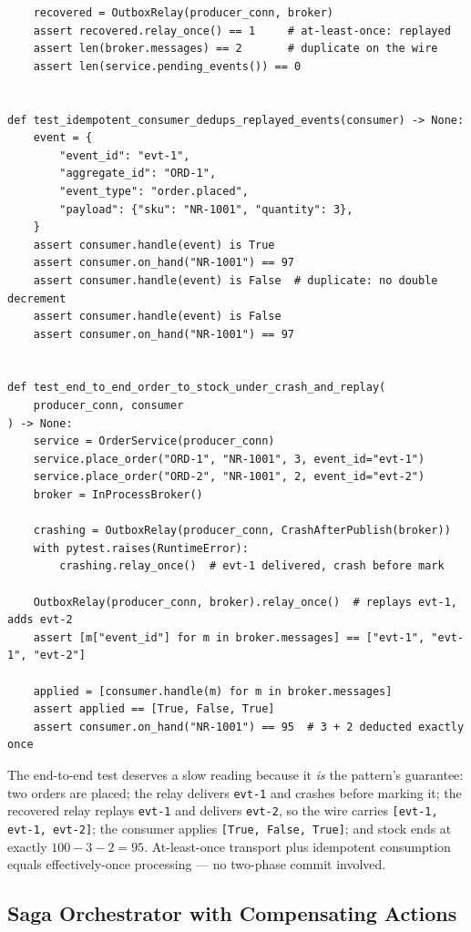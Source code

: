 \begin{verbatim}
    recovered = OutboxRelay(producer_conn, broker)
    assert recovered.relay_once() == 1     # at-least-once: replayed
    assert len(broker.messages) == 2       # duplicate on the wire
    assert len(service.pending_events()) == 0


def test_idempotent_consumer_dedups_replayed_events(consumer) -> None:
    event = {
        "event_id": "evt-1",
        "aggregate_id": "ORD-1",
        "event_type": "order.placed",
        "payload": {"sku": "NR-1001", "quantity": 3},
    }
    assert consumer.handle(event) is True
    assert consumer.on_hand("NR-1001") == 97
    assert consumer.handle(event) is False  # duplicate: no double decrement
    assert consumer.handle(event) is False
    assert consumer.on_hand("NR-1001") == 97


def test_end_to_end_order_to_stock_under_crash_and_replay(
    producer_conn, consumer
) -> None:
    service = OrderService(producer_conn)
    service.place_order("ORD-1", "NR-1001", 3, event_id="evt-1")
    service.place_order("ORD-2", "NR-1001", 2, event_id="evt-2")
    broker = InProcessBroker()

    crashing = OutboxRelay(producer_conn, CrashAfterPublish(broker))
    with pytest.raises(RuntimeError):
        crashing.relay_once()  # evt-1 delivered, crash before mark

    OutboxRelay(producer_conn, broker).relay_once()  # replays evt-1, adds evt-2
    assert [m["event_id"] for m in broker.messages] == ["evt-1", "evt-1", "evt-2"]

    applied = [consumer.handle(m) for m in broker.messages]
    assert applied == [True, False, True]
    assert consumer.on_hand("NR-1001") == 95  # 3 + 2 deducted exactly once
\end{verbatim}

The end-to-end test deserves a slow reading because it \emph{is} the
pattern's guarantee: two orders are placed; the relay delivers
\texttt{evt-1} and crashes before marking it; the recovered relay replays
\texttt{evt-1} and delivers \texttt{evt-2}, so the wire carries
\texttt{[evt-1, evt-1, evt-2]}; the consumer applies
\texttt{[True, False, True]}; and stock ends at exactly
$100 - 3 - 2 = 95$. At-least-once transport plus idempotent consumption
equals effectively-once processing --- no two-phase commit involved.

\subsection{Saga Orchestrator with Compensating Actions}
\label{subsec:ch15-code-saga}

